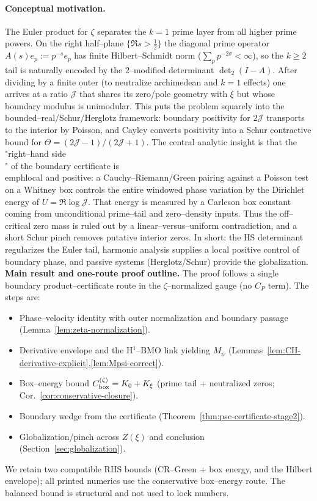 \documentclass[11pt]{article}
\theoremstyle{definition}
\theoremstyle{remark}
\begin{document}
\paragraph{Conceptual motivation.} The Euler product for $\zeta$ separates the $k=1$ prime layer from all higher prime powers. On the right half–plane $\{\Re s>\tfrac12\}$ the diagonal prime operator $A(s)e_p:=p^{-s}e_p$ has finite Hilbert–Schmidt norm ($\sum_p p^{-2\sigma}<\infty$), so the $k\ge2$ tail is naturally encoded by the 2–modified determinant $\det_2(I-A)$. After dividing by a finite outer (to neutralize archimedean and $k=1$ effects) one arrives at a ratio $\mathcal J$ that shares its zero/pole geometry with $\xi$ but whose boundary modulus is unimodular. This puts the problem squarely into the bounded–real/Schur/Herglotz framework: boundary positivity for $2\mathcal J$ transports to the interior by Poisson, and Cayley converts positivity into a Schur contractive bound for $\Theta=(2\mathcal J-1)/(2\mathcal J+1)$. The central analytic insight is that the \\"right–hand side\\" of the boundary certificate is \\emph{local and positive}: a Cauchy–Riemann/Green pairing against a Poisson test on a Whitney box controls the entire windowed phase variation by the Dirichlet energy of $U=\Re\log\mathcal J$. That energy is measured by a Carleson box constant coming from unconditional prime–tail and zero–density inputs. Thus the off–critical zero mass is ruled out by a linear–versus–uniform contradiction, and a short Schur pinch removes putative interior zeros. In short: the HS determinant regularizes the Euler tail, harmonic analysis supplies a local positive control of boundary phase, and passive systems (Herglotz/Schur) provide the globalization.
\noindent\textbf{Main result and one-route proof outline.} The proof follows a single boundary product–certificate route in the $\zeta$–normalized gauge (no $C_P$ term). The steps are:
\begin{itemize}
\item Phase–velocity identity with outer normalization and boundary passage (Lemma~\ref{lem:zeta-normalization}).
\item Derivative envelope and the H$^1$–BMO link yielding $M_\psi$ (Lemmas~\ref{lem:CH-derivative-explicit},\ref{lem:Mpsi-correct}).
\item Box–energy bound $C_{\rm box}^{(\zeta)}=K_0+K_\xi$ (prime tail + neutralized zeros; Cor.~\ref{cor:conservative-closure}).
\item Boundary wedge from the certificate (Theorem~\ref{thm:psc-certificate-stage2}).
\item Globalization/pinch across $Z(\xi)$ and conclusion (Section~\ref{sec:globalization}).
\end{itemize}
We retain two compatible RHS bounds (CR–Green + box energy, and the Hilbert envelope); all printed numerics use the conservative box–energy route. The balanced bound is structural and not used to lock numbers.
\end{document}
